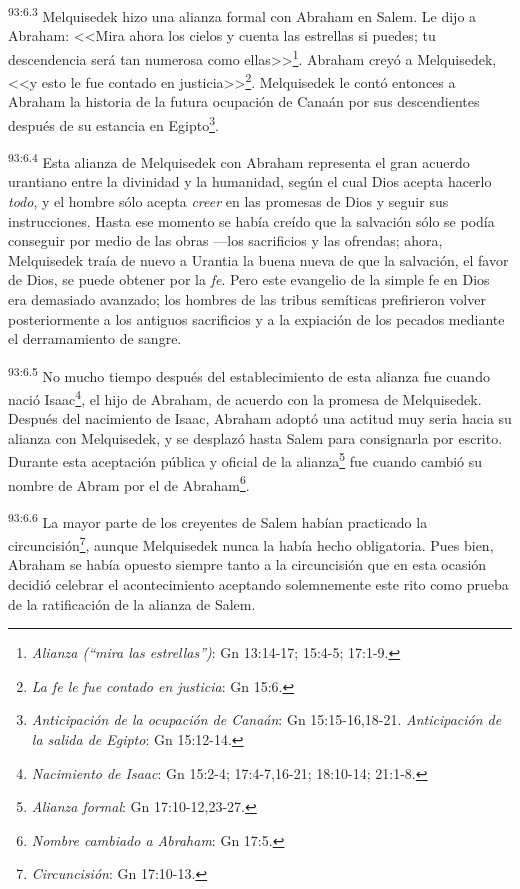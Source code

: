 \par
\textsuperscript{93:6.3} Melquisedek hizo una alianza formal con Abraham en Salem. Le dijo a Abraham: <<Mira ahora los cielos y cuenta las estrellas si puedes; tu descendencia será tan numerosa como ellas>>\footnote{\textit{Alianza (``mira las estrellas'')}: Gn 13:14-17; 15:4-5; 17:1-9.}. Abraham creyó a Melquisedek, <<y esto le fue contado en justicia>>\footnote{\textit{La fe le fue contado en justicia}: Gn 15:6.}. Melquisedek le contó entonces a Abraham la historia de la futura ocupación de Canaán por sus descendientes después de su estancia en Egipto\footnote{\textit{Anticipación de la ocupación de Canaán}: Gn 15:15-16,18-21. \textit{Anticipación de la salida de Egipto}: Gn 15:12-14.}.

\par
\textsuperscript{93:6.4} Esta alianza de Melquisedek con Abraham representa el gran acuerdo urantiano entre la divinidad y la humanidad, según el cual Dios acepta hacerlo \textit{todo}, y el hombre sólo acepta \textit{creer} en las promesas de Dios y seguir sus instrucciones. Hasta ese momento se había creído que la salvación sólo se podía conseguir por medio de las obras ---los sacrificios y las ofrendas; ahora, Melquisedek traía de nuevo a Urantia la buena nueva de que la salvación, el favor de Dios, se puede obtener por la \textit{fe}. Pero este evangelio de la simple fe en Dios era demasiado avanzado; los hombres de las tribus semíticas prefirieron volver posteriormente a los antiguos sacrificios y a la expiación de los pecados mediante el derramamiento de sangre.

\par
\textsuperscript{93:6.5} No mucho tiempo después del establecimiento de esta alianza fue cuando nació Isaac\footnote{\textit{Nacimiento de Isaac}: Gn 15:2-4; 17:4-7,16-21; 18:10-14; 21:1-8.}, el hijo de Abraham, de acuerdo con la promesa de Melquisedek. Después del nacimiento de Isaac, Abraham adoptó una actitud muy seria hacia su alianza con Melquisedek, y se desplazó hasta Salem para consignarla por escrito. Durante esta aceptación pública y oficial de la alianza\footnote{\textit{Alianza formal}: Gn 17:10-12,23-27.} fue cuando cambió su nombre de Abram por el de Abraham\footnote{\textit{Nombre cambiado a Abraham}: Gn 17:5.}.

\par
\textsuperscript{93:6.6} La mayor parte de los creyentes de Salem habían practicado la circuncisión\footnote{\textit{Circuncisión}: Gn 17:10-13.}, aunque Melquisedek nunca la había hecho obligatoria. Pues bien, Abraham se había opuesto siempre tanto a la circuncisión que en esta ocasión decidió celebrar el acontecimiento aceptando solemnemente este rito como prueba de la ratificación de la alianza de Salem.

